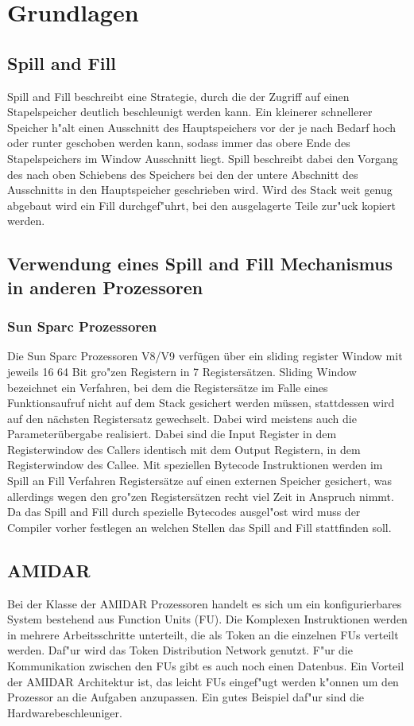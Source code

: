 \chapter{Grundlagen}
\label{cha:Grundlagen}

\section{Spill and Fill}

Spill and Fill beschreibt eine Strategie, durch die der Zugriff auf einen Stapelspeicher deutlich beschleunigt werden kann. Ein kleinerer schnellerer Speicher h"alt einen Ausschnitt des Hauptspeichers vor der je nach Bedarf hoch oder runter geschoben werden kann, sodass immer das obere Ende des Stapelspeichers im Window Ausschnitt liegt. Spill beschreibt dabei den Vorgang des nach oben Schiebens des Speichers bei den der untere Abschnitt des Ausschnitts in den Hauptspeicher geschrieben wird. Wird des Stack weit genug abgebaut wird ein Fill durchgef"uhrt, bei den ausgelagerte Teile zur"uck kopiert werden.  


\section{Verwendung eines Spill and Fill Mechanismus in anderen Prozessoren}
\subsection{Sun Sparc Prozessoren}
Die Sun Sparc Prozessoren V8/V9 verf\"ugen \"uber ein sliding register Window mit jeweils 16 64 Bit gro"zen Registern in 7 Registers\"atzen. Sliding Window bezeichnet ein Verfahren, bei dem die Registers\"atze im Falle eines Funktionsaufruf nicht auf dem Stack gesichert werden m\"ussen, stattdessen wird auf den n\"achsten Registersatz gewechselt. Dabei wird meistens auch die Parameter\"ubergabe realisiert. Dabei sind die Input Register in dem Registerwindow des Callers identisch mit dem Output Registern, in dem Registerwindow des Callee.   
Mit speziellen Bytecode Instruktionen werden im Spill an Fill Verfahren Registers\"atze auf einen externen Speicher gesichert, was allerdings wegen den gro"zen Registers\"atzen recht viel Zeit in Anspruch nimmt. Da das Spill and Fill durch spezielle Bytecodes ausgel"ost wird muss der Compiler vorher festlegen an welchen Stellen das Spill and Fill stattfinden soll. \cite{Gove}
\section{AMIDAR}
Bei der Klasse der AMIDAR Prozessoren handelt es sich um ein konfigurierbares System bestehend aus Function Units (FU). Die Komplexen Instruktionen werden in mehrere Arbeitsschritte unterteilt, die als Token an die einzelnen FUs verteilt werden. Daf"ur wird das Token Distribution Network genutzt. F"ur die Kommunikation zwischen den FUs gibt es auch noch einen Datenbus. Ein Vorteil der AMIDAR Architektur ist, das leicht FUs eingef"ugt werden k"onnen um den Prozessor an die Aufgaben anzupassen. Ein gutes Beispiel daf"ur sind die Hardwarebeschleuniger. \cite{Burkert}\cite{Andresen}


